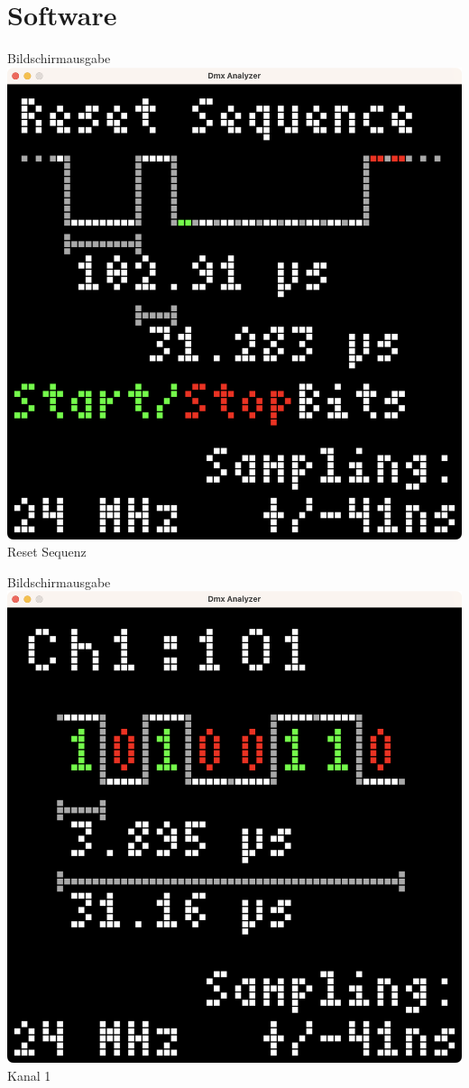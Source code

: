 \documentclass[Nike]{tuberlinbeamer}
\begin{document}
\section{Software}
\begin{frame}{Bildschirmausgabe}
	\centering
	\includegraphics[height=\textheight - 25pt]{pictures/screenshotResetSequence}\\
	Reset Sequenz
	
\end{frame}

\begin{frame}{Bildschirmausgabe}
	\centering
	\includegraphics[height=\textheight - 25pt]{pictures/screnshotChannel1}\\
	Kanal 1
\end{frame}
\end{document}
